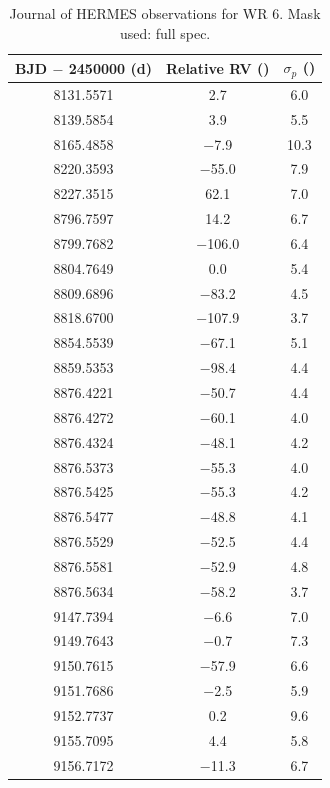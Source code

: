 \begin{table}[h!]
    \centering
    \caption{Journal of HERMES observations for WR 6. Mask used: full spec.}
    \begin{tabular}{ccc} \hline \hline
        BJD $-$ 2450000 (d) & Relative RV (\kms{}) & $\sigma_p$ (\kms{}) \\ \hline
        8131.5571 & 2.7 & 6.0 \\ 
        8139.5854 & 3.9 & 5.5 \\ 
        8165.4858 & $-$7.9 & 10.3 \\ 
        8220.3593 & $-$55.0 & 7.9 \\ 
        8227.3515 & 62.1 & 7.0 \\ 
        8796.7597 & 14.2 & 6.7 \\ 
        8799.7682 & $-$106.0 & 6.4 \\ 
        8804.7649 & 0.0 & 5.4 \\ 
        8809.6896 & $-$83.2 & 4.5 \\ 
        8818.6700 & $-$107.9 & 3.7 \\ 
        8854.5539 & $-$67.1 & 5.1 \\ 
        8859.5353 & $-$98.4 & 4.4 \\ 
        8876.4221 & $-$50.7 & 4.4 \\ 
        8876.4272 & $-$60.1 & 4.0 \\ 
        8876.4324 & $-$48.1 & 4.2 \\ 
        8876.5373 & $-$55.3 & 4.0 \\ 
        8876.5425 & $-$55.3 & 4.2 \\ 
        8876.5477 & $-$48.8 & 4.1 \\ 
        8876.5529 & $-$52.5 & 4.4 \\ 
        8876.5581 & $-$52.9 & 4.8 \\ 
        8876.5634 & $-$58.2 & 3.7 \\ 
        9147.7394 & $-$6.6 & 7.0 \\ 
        9149.7643 & $-$0.7 & 7.3 \\ 
        9150.7615 & $-$57.9 & 6.6 \\ 
        9151.7686 & $-$2.5 & 5.9 \\ 
        9152.7737 & 0.2 & 9.6 \\ 
        9155.7095 & 4.4 & 5.8 \\ 
        9156.7172 & $-$11.3 & 6.7 \\ \hline
    \end{tabular}
    \label{tab:WR6}
\end{table}


